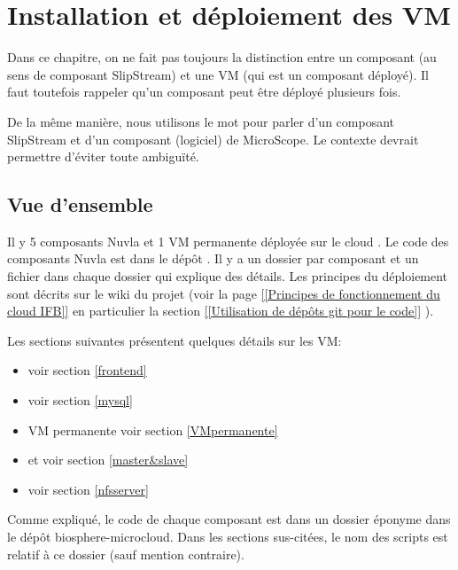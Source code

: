 \chapter{Installation et déploiement des VM} \label{chap:deploiement_VM}

Dans ce chapitre, on ne fait pas toujours la distinction entre un composant (au sens de composant SlipStream)
et une VM (qui est un composant déployé).
Il faut toutefois rappeler qu'un composant peut être déployé plusieurs fois.

De la même manière, nous utilisons le mot  pour parler d'un composant SlipStream
et d'un composant (logiciel) de MicroScope.
Le contexte devrait permettre d'éviter toute ambiguïté.

\section{Vue d'ensemble}

Il y 5 composants Nuvla et
1 VM permanente déployée sur le cloud .
Le code des composants Nuvla est dans le dépôt .
Il y a un dossier par composant et un fichier  dans chaque dossier qui explique des détails.
Les principes du déploiement sont décrits sur le wiki du projet (voir la page
\href{https://intranet.genoscope.cns.fr/agc/redmine/projects/microcloud/wiki/Principes_de_fonctionnement_du_cloud_IFB}
{[[Principes de fonctionnement du cloud IFB]]}
en particulier la section
\href{https://intranet.genoscope.cns.fr/agc/redmine/projects/microcloud/wiki/Principes_de_fonctionnement_du_cloud_IFB#Utilisation-de-deacutepocircts-git-pour-le-code}
{[[Utilisation de dépôts git pour le code]]}
).

Les sections suivantes présentent quelques détails sur les VM:
\begin{itemize}
    \item {} voir section \ref{frontend}
    \item {} voir section \ref{mysql}
    \item VM permanente voir section \ref{VMpermanente}
    \item {} et  voir section \ref{master&slave}
    \item {} voir section \ref{nfsserver}
\end{itemize}
Comme expliqué, le code de chaque composant est dans un dossier éponyme dans le dépôt biosphere-microcloud.
Dans les sections sus-citées, le nom des scripts est relatif à ce dossier (sauf mention contraire).

